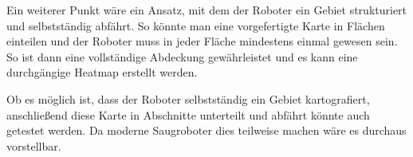 \documentclass{scrartcl}%
\begin{document}
Ein weiterer Punkt wäre ein Ansatz, mit dem der Roboter ein Gebiet strukturiert und selbstständig abfährt. So könnte man eine vorgefertigte Karte in Flächen einteilen und der Roboter muss in jeder Fläche mindestens einmal gewesen sein. So ist dann eine vollständige Abdeckung gewährleistet und es kann eine durchgängige Heatmap erstellt werden.

Ob es möglich ist, dass der Roboter selbstständig ein Gebiet kartografiert, anschließend diese Karte in Abschnitte unterteilt und abfährt könnte auch getestet werden. Da moderne Saugroboter dies teilweise machen wäre es durchaus vorstellbar.

\newpage
\begin{flushleft}
	\printbibliography
\end{flushleft}
\end{document}
